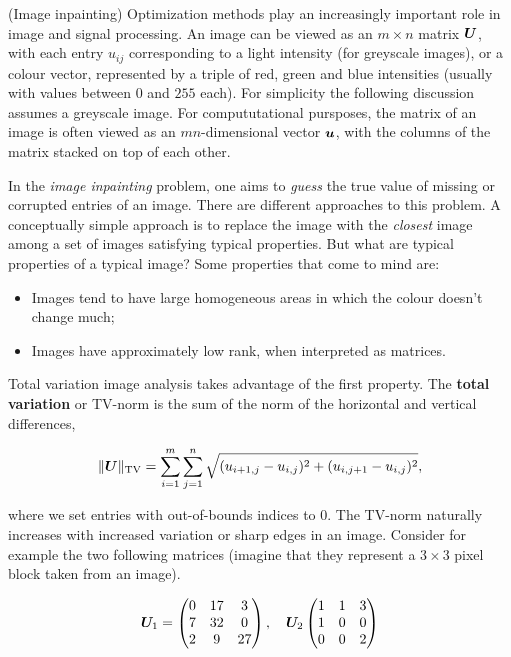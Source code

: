 \begin{example}(Image inpainting)
Optimization methods play an increasingly important role in image and signal processing. An image can be viewed as an $m\times n$ matrix $\bm{U}$, with each entry $u_{ij}$ corresponding to a light intensity (for greyscale images), or a colour vector, represented by a triple of red, green and blue intensities (usually with values between $0$ and $255$ each). For simplicity the following discussion assumes a greyscale image. For compututational pursposes, the matrix of an image is often viewed as an $mn$-dimensional vector $\bm{u}$, with the columns of the matrix stacked on top of each other. 

In the {\em image inpainting} problem, one aims to {\em guess} the true value of missing or corrupted entries of an image. There are different approaches to this problem. A conceptually simple approach is to replace the image with the {\em closest} image among a set of images satisfying typical properties. But what are typical properties of a typical image? Some properties that come to mind are:

\begin{itemize}
\item Images tend to have large homogeneous areas in which the colour doesn't change much;
\item Images have approximately low rank, when interpreted as matrices.
\end{itemize}

Total variation image analysis takes advantage of the first property. The \textbf{total variation} or TV-norm is the sum of the norm of the horizontal and vertical differences,

\begin{equation*}
  \|\bm{U}\|_{\mathrm{TV}} = \sum_{i=1}^m \sum_{j=1}^n \sqrt{(u_{i+1,j}-u_{i,j})^2+(u_{i,j+1}-u_{i,j})^2},
\end{equation*}

where we set entries with out-of-bounds indices to $0$. The TV-norm naturally increases with increased variation or sharp edges in an image. Consider for example the two following matrices (imagine that they represent a $3\times 3$ pixel block taken from an image).

\begin{equation*}
\bm{U}_1 = \begin{pmatrix}
 0 & 17 & 3 \\
 7 & 32 & 0 \\
 2 & 9 & 27
\end{pmatrix}, \quad
\bm{U}_2\begin{pmatrix}
1 & 1 & 3\\
1 & 0 & 0\\
0 & 0 & 2
\end{pmatrix}
\end{equation*}


\end{example}
